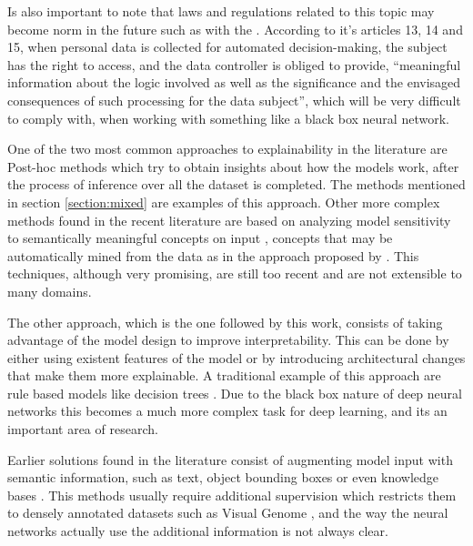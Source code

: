 Is also important to note that laws and regulations related to this topic may become norm
in the future such as with the . According to it's articles
13, 14 and 15, when personal data is collected for automated decision-making,
the subject has the right to access, and the data controller is obliged to provide,
“meaningful information about the logic involved  as well as the significance and the envisaged
consequences of such processing for the data subject”, which will be very difficult to comply with,
when working with something like a black box neural network.

One of the two most common approaches to explainability in the literature are Post-hoc methods
\cite{adadi_xai} which try to obtain insights about how the models work, after the process of
inference over all the dataset is completed. The methods mentioned in section
\ref{section:mixed} are examples of this approach. Other more complex methods found in the recent literature
are based on analyzing model sensitivity to semantically meaningful concepts on input \cite{kim_tcav, shi_concept},
concepts that may be automatically mined from the data as in the approach proposed by . This techniques, although
very promising, are still too recent and are not extensible to many domains.

The other approach, which is the one followed by this work, consists of taking advantage of the model
design to improve interpretability. This can be done by either using existent features of the model
or by introducing architectural changes that make them more explainable. A traditional  example of
this approach are rule based models like  decision trees \cite{breiman_tree}. Due to the black box
nature of deep neural networks this becomes a much more complex task for deep learning, and its an
important area of research.

Earlier solutions found in the literature consist of augmenting
model input with semantic information, such as text, object bounding boxes or even knowledge bases
\cite{dong_semantic, zhuo_video, li_knowledge}. This methods usually require additional supervision
which restricts them to densely annotated datasets such as Visual Genome \cite{krishna_visualgenome},
and the way the neural networks actually  use the additional information is not always clear.

